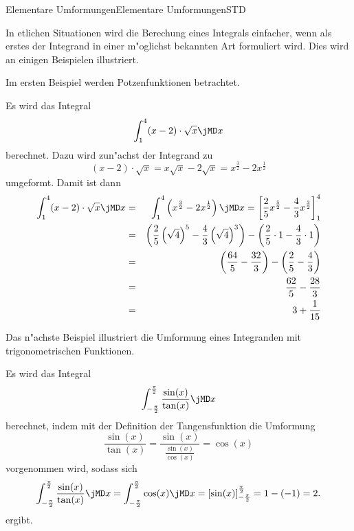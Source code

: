 


\begin{MXContent}{Elementare Umformungen}{Elementare Umformungen}{STD}

In etlichen Situationen wird die Berechung eines Integrals einfacher, 
wenn als erstes der Integrand in einer m"oglichst bekannten Art formuliert 
wird. Dies wird an einigen Beispielen illustriert.

Im ersten Beispiel werden Potzenfunktionen betrachtet.
\begin{MExample}
Es wird das Integral 
\[
\int_{1}^{4} (x - 2) \cdot \sqrt{x} \jMD x %
\]
berechnet. Dazu wird zun"achst der Integrand zu
\[
 (x - 2) \cdot \sqrt{x} = x \sqrt{x} - 2 \sqrt{x} %
 = x^{\frac{3}{2}} - 2 x^{\frac{1}{2}} %
\]
umgeformt. Damit ist dann
\begin{eqnarray*}
\int_{1}^{4} (x - 2) \cdot \sqrt{x} \jMD x %
& = &
\int_{1}^{4} \left(x^{\frac{3}{2}} - 2 x^{\frac{1}{2}}\right) \jMD x %
  =  
\left[\frac{2}{5} x^{\frac{5}{2}} - \frac{4}{3} x^{\frac{3}{2}}\right]_{1}^{4} \\
& = &
\left(\frac{2}{5} \left(\sqrt{4}\right)^5 - \frac{4}{3} \left(\sqrt{4}\right)^3 \right) %
 - \left(\frac{2}{5} \cdot 1 - \frac{4}{3} \cdot 1 \right) \\
& = &
\left(\frac{64}{5} - \frac{32}{3}\right) - \left(\frac{2}{5} - \frac{4}{3}\right) \\
& = & \frac{62}{5} - \frac{28}{3} \\
& = & 3 + \frac{1}{15} %
\end{eqnarray*}
\end{MExample}

Das n"achste Beispiel illustriert die Umformung eines Integranden mit 
trigonometrischen Funktionen.
\begin{MExample}
Es wird das Integral 
\[
\int_{-\frac{\pi}{2}}^{\frac{\pi}{2}} \frac{\sin(x)}{\tan(x)} \jMD x %
\]
berechnet, indem mit der Definition der Tangensfunktion die Umformung
\[
\frac{\sin(x)}{\tan(x)} %
= \frac{\sin(x)}{\frac{\sin(x)}{\cos(x)}} %
= \cos(x) %
\]
vorgenommen wird, sodass sich
\[
\int_{-\frac{\pi}{2}}^{\frac{\pi}{2}} \frac{\sin(x)}{\tan(x)} \jMD x %
= 
\int_{-\frac{\pi}{2}}^{\frac{\pi}{2}} \cos(x) \jMD x %
= 
\left[\sin(x)\right]_{-\frac{\pi}{2}}^{\frac{\pi}{2}} %
= 
1 - (-1) = 2. %
\]
ergibt.
\end{MExample}


\end{MXContent}
